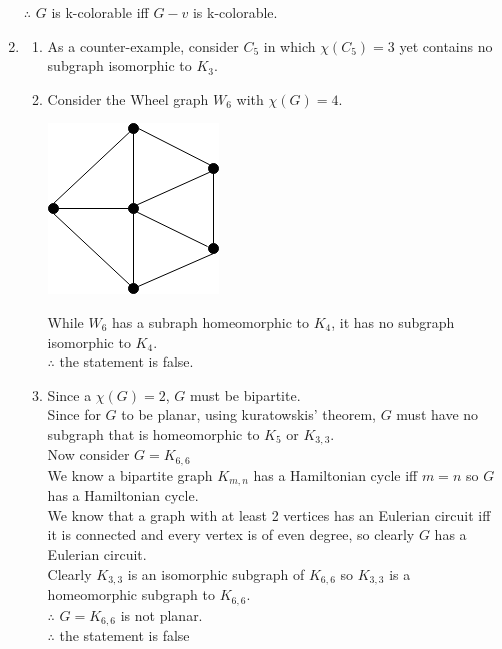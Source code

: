 \documentclass[11pt]{article}
\begin{document}
\begin{enumerate}[]
		$\therefore$ $G$ is k-colorable iff $G-v$ is k-colorable.  	 
    \item
    \begin{enumerate}[label=\alph*)]
    \item
    	As a counter-example, consider $C_5$ in which $\chi(C_5) = 3$ yet contains no subgraph isomorphic to $K_3$.
    \item
    	Consider the Wheel graph $W_6$ with  $\chi(G)=4$.\\
    	\begin{center}
		\includegraphics[scale=0.5]{q6b-graph.png}\\
		\end{center}
		While $W_6$ has a subraph homeomorphic to $K_4$, it has no subgraph isomorphic to $K_4$.\\
		$\therefore$ the statement is false.
    	
    \item
    	Since a  $\chi(G)=2$, $G$ must be bipartite.\\
    	Since for $G$ to be planar, using kuratowskis' theorem, $G$ must have no subgraph that is homeomorphic to $K_5$ or $K_{3,3}$.\\
    	Now consider $G=K_{6,6}$\\
    	We know a bipartite graph $K_{m,n}$ has a Hamiltonian cycle iff $m=n$ so $G$ has a Hamiltonian cycle.\\
    	We know that a graph with at least 2 vertices has an Eulerian circuit iff it is connected and every vertex is of even degree, so clearly $G$ has a Eulerian circuit.\\
    	Clearly $K_{3,3}$ is an isomorphic subgraph of $K_{6,6}$ so $K_{3,3}$ is a homeomorphic subgraph to $K_{6,6}$.\\
    	$\therefore$ $G=K_{6,6}$ is not planar.\\
    	$\therefore$ the statement is false
    \end{enumerate}

\end{enumerate}
\end{document}
